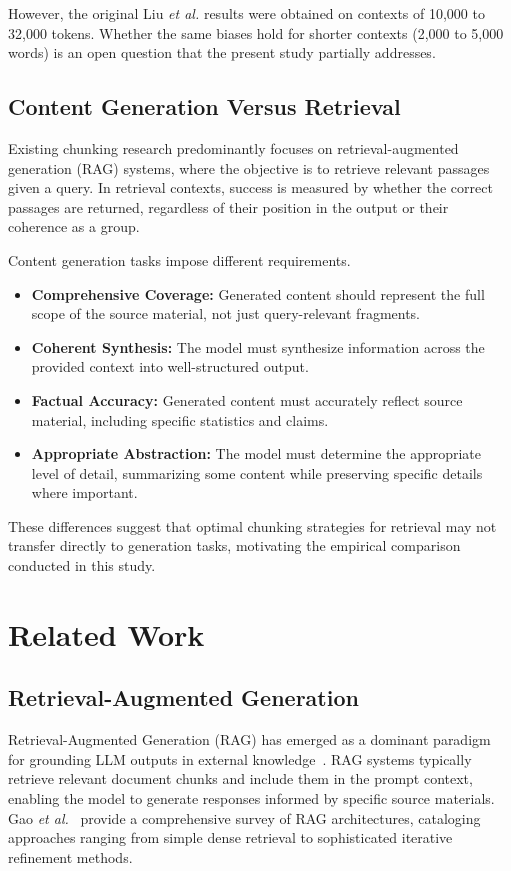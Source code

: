 \documentclass{ieeeaccess}
\begin{document}
However, the original Liu \emph{et al.} results were obtained on contexts of 10,000 to 32,000 tokens. Whether the same biases hold for shorter contexts (2,000 to 5,000 words) is an open question that the present study partially addresses.

\subsection{Content Generation Versus Retrieval}

Existing chunking research predominantly focuses on retrieval-augmented generation (RAG) systems, where the objective is to retrieve relevant passages given a query. In retrieval contexts, success is measured by whether the correct passages are returned, regardless of their position in the output or their coherence as a group.

Content generation tasks impose different requirements.
\begin{itemize}
    \item \textbf{Comprehensive Coverage:} Generated content should represent the full scope of the source material, not just query-relevant fragments.
    \item \textbf{Coherent Synthesis:} The model must synthesize information across the provided context into well-structured output.
    \item \textbf{Factual Accuracy:} Generated content must accurately reflect source material, including specific statistics and claims.
    \item \textbf{Appropriate Abstraction:} The model must determine the appropriate level of detail, summarizing some content while preserving specific details where important.
\end{itemize}

These differences suggest that optimal chunking strategies for retrieval may not transfer directly to generation tasks, motivating the empirical comparison conducted in this study.

\section{Related Work}
\label{sec:related}

\subsection{Retrieval-Augmented Generation}

Retrieval-Augmented Generation (RAG) has emerged as a dominant paradigm for grounding LLM outputs in external knowledge~\cite{b2}. RAG systems typically retrieve relevant document chunks and include them in the prompt context, enabling the model to generate responses informed by specific source materials. Gao \emph{et al.}~\cite{b3} provide a comprehensive survey of RAG architectures, cataloging approaches ranging from simple dense retrieval to sophisticated iterative refinement methods.
\end{document}
